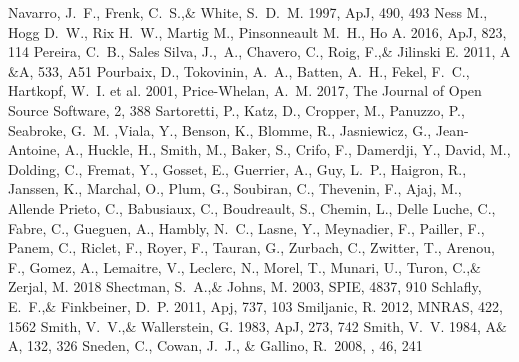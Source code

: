 \documentclass[a4paper,fleqn,usenatbib]{mnras}
\begin{document}
\begin{thebibliography}{99}
Navarro, J.~F., Frenk, C.~S.,\& White, S.~D.~M. 1997, 
ApJ, 490, 493
Ness M., Hogg D.~W., Rix H.~W., Martig M., Pinsonneault M.~H., Ho A. 2016, 
ApJ, 823, 114
Pereira, C.~B., Sales Silva, J.,~A., Chavero, C., Roig, F.,\& Jilinski E. 2011, 
A$\&$A, 533, A51
Pourbaix, D., Tokovinin, A.~A., Batten, A.~H., Fekel, F.~C., Hartkopf, W.~I. et al. 2001, 
Price-Whelan, A.~M. 2017, 
The Journal of Open Source Software, 2, 388
Sartoretti, P., Katz, D., Cropper, M., Panuzzo, P., Seabroke, G.~M. ,Viala, Y., Benson, K., Blomme, R., Jasniewicz, G., Jean-Antoine, A., Huckle, H., Smith, M., Baker, S., Crifo, F., Damerdji, Y., David, M., Dolding, C., Fremat, Y., Gosset, E., Guerrier, A., Guy, L.~P., Haigron, R., Janssen, K., Marchal, O., Plum, G., Soubiran, C., Thevenin, F., Ajaj, M., Allende Prieto, C., Babusiaux, C., Boudreault, S., Chemin, L., Delle Luche, C., Fabre, C., Gueguen, A., Hambly, N.~C., Lasne, Y., Meynadier, F., Pailler, F., Panem, C., Riclet, F., Royer, F., Tauran, G., Zurbach, C., Zwitter, T., Arenou, F., Gomez, A., Lemaitre, V., Leclerc, N., Morel, T., Munari, U., Turon, C.,\& Zerjal, M. 2018
Shectman, S.~A.,\& Johns, M. 2003, 
SPIE, 4837, 910
Schlafly, E.~F.,\& Finkbeiner, D.~P. 2011, 
Apj, 737, 103
Smiljanic, R. 2012, 
MNRAS, 422, 1562
Smith, V.~V.,\& Wallerstein, G. 1983, 
ApJ, 273, 742
Smith, V.~V. 1984, 
A$\&$A, 132, 326
 Sneden, C., Cowan, J.~J., \& Gallino, R.\ 2008, \araa, 46, 241 

\end{thebibliography}
\end{document}
